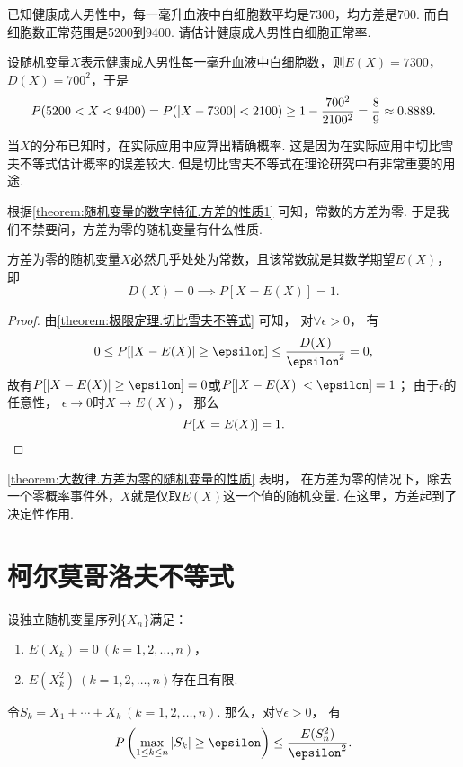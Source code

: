 \begin{example}
已知健康成人男性中，每一毫升血液中白细胞数平均是7300，均方差是700.
而白细胞数正常范围是5200到9400.
请估计健康成人男性白细胞正常率.
\begin{solution}
设随机变量\(X\)表示健康成人男性每一毫升血液中白细胞数，则\(E(X) = 7300\)，\(D(X) = 700^2\)，于是\[
P(5200 < X < 9400)
= P(\abs{X - 7300} < 2100)
\geq 1 - \frac{700^2}{2100^2} = \frac{8}{9}
\approx 0.8889.
\]
\end{solution}
\end{example}

当\(X\)的分布已知时，在实际应用中应算出精确概率.
这是因为在实际应用中切比雪夫不等式估计概率的误差较大.
但是切比雪夫不等式在理论研究中有非常重要的用途.

根据\cref{theorem:随机变量的数字特征.方差的性质1} 可知，常数的方差为零.
于是我们不禁要问，方差为零的随机变量有什么性质.
\begin{theorem}\label{theorem:大数律.方差为零的随机变量的性质}
方差为零的随机变量\(X\)必然几乎处处为常数，且该常数就是其数学期望\(E(X)\)，即\[
	D(X)=0 \implies P[X=E(X)]=1.
\]
\begin{proof}
由\cref{theorem:极限定理.切比雪夫不等式} 可知，
对\(\forall\epsilon>0\)，
有\[
	0 \leq P[\abs{X-E(X)}\geq\epsilon]
	\leq \frac{D(X)}{\epsilon^2}
	= 0,
\]
故有\(P[\abs{X-E(X)}\geq\epsilon] = 0\)或\(P[\abs{X-E(X)}<\epsilon] = 1\)；
由于\(\epsilon\)的任意性，
\(\epsilon\to0\)时\(X \to E(X)\)，
那么\[
	P[X=E(X)]=1.
	\qedhere
\]
\end{proof}
\end{theorem}
\cref{theorem:大数律.方差为零的随机变量的性质} 表明，
在方差为零的情况下，除去一个零概率事件外，\(X\)就是仅取\(E(X)\)这一个值的随机变量.
在这里，方差起到了决定性作用.

\section{柯尔莫哥洛夫不等式}
\begin{theorem}
设独立随机变量序列\(\{X_n\}\)满足：\begin{enumerate}
	\item \(E(X_k) = 0\ (k=1,2,\dotsc,n)\)，
	\item \(E(X_k^2)\ (k=1,2,\dotsc,n)\)存在且有限.
\end{enumerate}
令\(S_k = X_1 + \dotsb + X_k\ (k=1,2,\dotsc,n)\).
那么，对\(\forall \epsilon > 0\)，
有\[
	P\left(\max_{1 \leq k \leq n} \abs{S_k} \geq \epsilon\right)
	\leq \frac{E(S_n^2)}{\epsilon^2}.
\]
\end{theorem}

